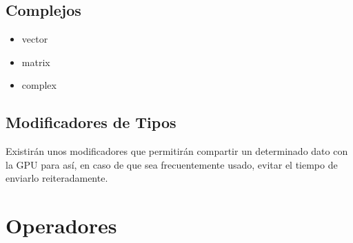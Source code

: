 \documentclass[12pt,a4paper]{article}
\begin{document}
\subsection{Complejos}
\begin{itemize}
\item vector
\item matrix
\item complex
\end{itemize}
\subsection{Modificadores de Tipos}
Existirán unos modificadores que permitirán compartir un determinado dato con la
GPU para así, en caso de que sea frecuentemente usado, evitar el tiempo de
enviarlo reiteradamente.
\section{Operadores}
\end{document}
